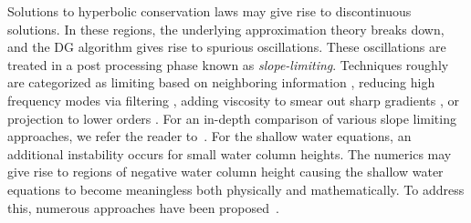 Solutions to hyperbolic conservation laws may give rise to discontinuous solutions. In these regions, the underlying approximation theory breaks down, and the DG algorithm gives rise to spurious oscillations. These oscillations are treated in a post processing phase known as {\em slope-limiting}. Techniques roughly are categorized as limiting based on neighboring information \cite{Cockburn1989b,Kuzmin2010,Bell1988}, reducing high frequency modes via filtering \cite{Hesthaven08,Maday1993,Meister2011}, adding viscosity to smear out sharp gradients \cite{Guermond2011,Persson2006}, or projection to lower orders \cite{Dumbser2016}. For an in-depth comparison of various slope limiting approaches, we refer the reader to~\cite{Michoski2015}. For the shallow water equations, an additional instability occurs for small water column heights. The numerics may give rise to regions of negative water column height causing the shallow water equations to become meaningless both physically and mathematically. To address this, numerous approaches have been proposed~\cite{Bunya2009,Gandham2015,Casulli2009,Vater2015,Xing2013,Rannabauer2018}.